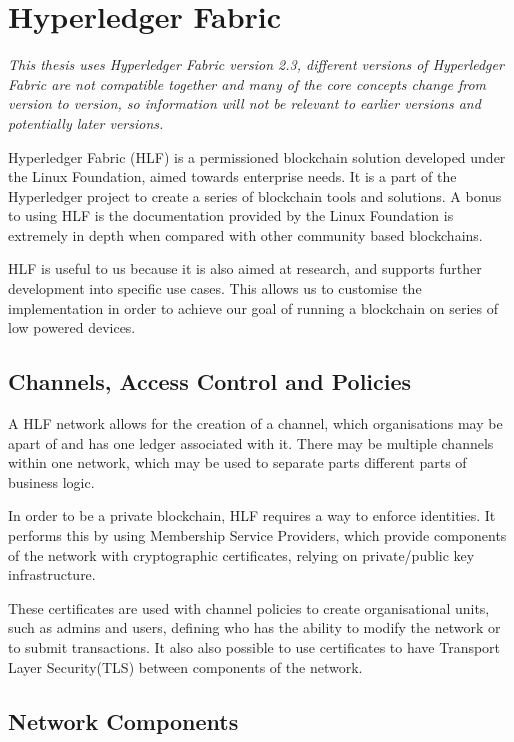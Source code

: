 \section{Hyperledger Fabric}

\textit{This thesis uses Hyperledger Fabric version 2.3, different versions of Hyperledger Fabric are not compatible together and many of the core concepts change from version to version, so information will not be relevant to earlier versions and potentially later versions.}

Hyperledger Fabric (HLF) is a permissioned blockchain solution developed under the Linux Foundation, aimed towards enterprise needs. It is a part of the Hyperledger project to create a series of blockchain tools and solutions. A bonus to using HLF is the documentation provided by the Linux Foundation is extremely in depth when compared with other community based blockchains.

HLF is useful to us because it is also aimed at research, and supports further development into specific use cases. This allows us to customise the implementation in order to achieve our goal of running a blockchain on series of low powered devices.

\subsection{Channels, Access Control and Policies}

A HLF network allows for the creation of a channel, which organisations may be apart of and has one ledger associated with it. There may be multiple channels within one network, which may be used to separate parts different parts of business logic.

In order to be a private blockchain, HLF requires a way to enforce identities. It performs this by using Membership Service Providers, which provide components of the network with cryptographic certificates, relying on private/public key infrastructure.

These certificates are used with channel policies to create organisational units, such as admins and users, defining who has the ability to modify the network or to submit transactions. It also also possible to use certificates to have Transport Layer Security(TLS) between components of the network. 


\subsection{Network Components}

